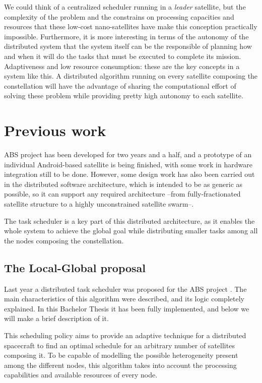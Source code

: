 We could think of a centralized scheduler running in a \emph{leader} satellite, but the complexity of the problem and the constrains on processing capacities and resources that these low-cost nano-satellites have make this conception practically impossible. Furthermore, it is more interesting in terms of the autonomy of the distributed system that the system itself can be the responsible of planning how and when it will do the tasks that must be executed to complete its mission. Adaptiveness and low resource consumption: these are the key concepts in a system like this. A distributed algorithm running on every satellite composing the constellation will have the advantage of sharing the computational effort of solving these problem while providing pretty high autonomy to each satellite.


\section{Previous work}
\label{previouswork}
ABS project has been developed for two years and a half, and a prototype of an individual Android-based satellite is being finished, with some work in hardware integration still to be done. However, some design work has also been carried out in the distributed software architecture, which is intended to be as generic as possible, so it can support any required architecture --from fully-fractionated satellite structure to a highly unconstrained satellite swarm--.

The task scheduler is a key part of this distributed architecture, as it enables the whole system to achieve the global goal while distributing smaller tasks among all the nodes composing the constellation.

\subsection{The Local-Global proposal}

Last year a distributed task scheduler was proposed for the ABS project \citep{Araguz15}. The main characteristics of this algorithm were described, and its logic completely explained. In this Bachelor Thesis it has been fully implemented, and below we will make a brief description of it.

This scheduling policy aims to provide an adaptive technique for a distributed spacecraft to find an optimal schedule for an arbitrary number of satellites composing it. To be capable of modelling the possible heterogeneity present among the different nodes, this algorithm takes into account the processing capabilities and available resources of every node.

